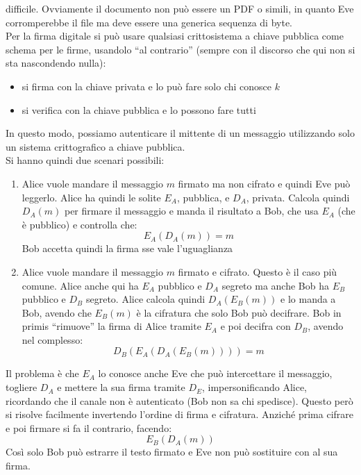\documentclass[a4paper,12pt, oneside]{book}
\begin{document}
difficile. Ovviamente il documento non può essere un PDF o simili, in quanto Eve
corromperebbe il file ma deve essere una generica sequenza di byte.\\
Per la firma digitale si può usare qualsiasi crittosistema a chiave pubblica
come schema per le firme, usandolo ``al contrario'' (sempre con il discorso che
qui non si sta nascondendo nulla):
\begin{itemize}
  \item si firma con la chiave privata e lo può fare solo chi conosce $k$
  \item si verifica con la chiave pubblica e lo possono fare tutti
\end{itemize}
In questo modo, possiamo autenticare il mittente di un messaggio utilizzando
solo un sistema crittografico a chiave pubblica.\\
Si hanno quindi due scenari possibili:
\begin{enumerate}
  \item Alice vuole mandare il messaggio $m$ firmato ma non cifrato e quindi Eve
  può leggerlo. Alice ha quindi le solite $E_A$, pubblica, e $D_A$,
  privata. Calcola quindi $D_A(m)$ per firmare il messaggio e manda il risultato
  a Bob, che usa $E_A$ (che è pubblico) e controlla che:
  \[E_A(D_A(m))=m\]
  Bob accetta quindi la firma sse vale l'uguaglianza
  \item Alice vuole mandare il messaggio $m$ firmato e cifrato. Questo è il caso
  più comune. Alice anche qui ha $E_A$ pubblico e $D_A$ segreto ma anche Bob ha
  $E_B$ pubblico e $D_B$ segreto. Alice calcola quindi $D_A(E_B(m))$ e lo manda
  a Bob, avendo che $E_B(m)$ è la cifratura che solo Bob può decifrare. Bob in
  primis ``rimuove'' la firma di Alice tramite $E_A$ e poi decifra con $D_B$,
  avendo nel complesso:
  \[D_B(E_A(D_A(E_B(m))))=m\]
\end{enumerate}
Il problema è che $E_A$ lo conosce anche Eve che può intercettare il messaggio,
togliere $D_A$ e mettere la sua firma tramite $D_E$, impersonificando Alice,
ricordando che il canale non è autenticato (Bob non sa chi spedisce). Questo
però si risolve facilmente invertendo l'ordine di firma e cifratura. Anziché
prima cifrare e poi firmare si fa il contrario, facendo:
\[E_B(D_A(m))\]
Così solo Bob può estrarre il testo firmato e Eve non può sostituire con al sua
firma.
\end{document}
